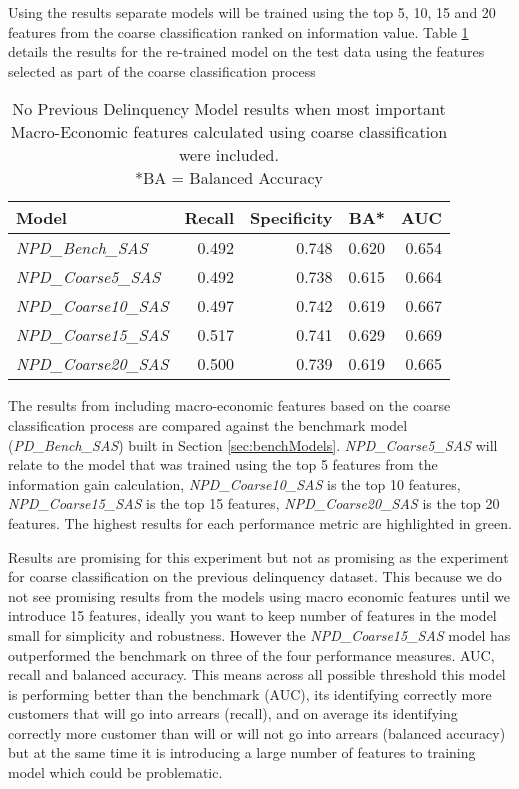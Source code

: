 Using the results separate models will be trained using the top 5, 10, 15 and 20 features from
the coarse classification ranked on information value. Table \ref{table:CoarseNPDModelResults} details the results for the re-trained model
on the test data using the features selected as part of the coarse classification process

\begin{table}[H]
	\centering
	\small
	\begin{tabular}{l r r r r}
		\hline
		\textbf{Model} & \textbf{Recall} & \textbf{Specificity} & \textbf{BA*} & \textbf{AUC}  \\ \hline
		\textit{NPD\_Bench\_SAS} & 0.492 & \cellcolor{green!25}0.748 & 0.620 & 0.654 \\ \hline
		\textit{NPD\_Coarse5\_SAS}  & 0.492 & 0.738 & 0.615 & 0.664   \\ 
		\textit{NPD\_Coarse10\_SAS} & 0.497 & 0.742 & 0.619 & 0.667  \\ 
		\textit{NPD\_Coarse15\_SAS} & \cellcolor{green!25}0.517 & 0.741 & \cellcolor{green!25}0.629 & \cellcolor{green!25}0.669  \\
		\textit{NPD\_Coarse20\_SAS} & 0.500 & 0.739 & 0.619 & 0.665  \\\hline 
	\end{tabular}
	\caption{{No Previous Delinquency Model results when most important\\
			Macro-Economic features calculated using coarse classification were included.
			\\ *BA = Balanced Accuracy}}
	\label{table:CoarseNPDModelResults}
\end{table}
The results from including macro-economic features based on the coarse classification process are compared against the benchmark model (\textit{PD\_Bench\_SAS}) built in Section \ref{sec:benchModels}. \textit{NPD\_Coarse5\_SAS} will relate to the model that was trained using the top 5 features from the information gain calculation, \textit{NPD\_Coarse10\_SAS} is the top 10 features, \textit{NPD\_Coarse15\_SAS} is the top 15 features, \textit{NPD\_Coarse20\_SAS} is the top 20 features. The highest results for each performance metric are highlighted in green.

Results are promising for this experiment but not as promising as the experiment for coarse classification on the previous delinquency dataset. This because we do not see promising results from the models using macro economic features until we introduce 15 features, ideally you want to keep number of features in the model small for simplicity and robustness. However the \textit{NPD\_Coarse15\_SAS} model has outperformed the benchmark on three of the four performance measures. AUC, recall and balanced accuracy. This means across all possible threshold this model is performing better than the benchmark (AUC), its identifying correctly more customers that will go into arrears (recall), and on average its identifying correctly more customer than will or will not go into arrears (balanced accuracy) but at the same time it is introducing a large number of features to training model which could be problematic. 

